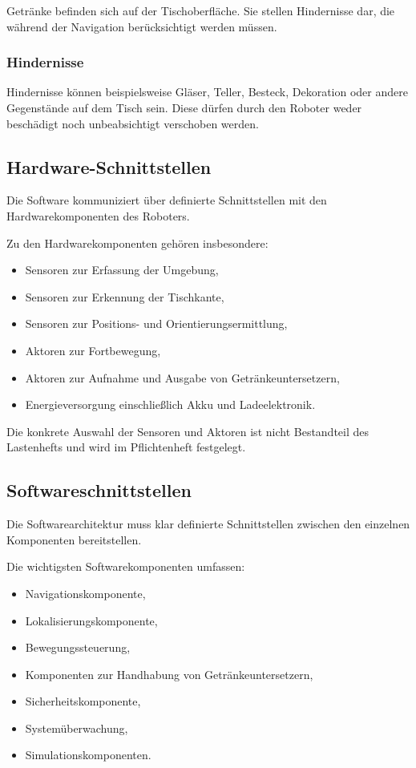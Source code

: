 \documentclass[
  a4paper,
  12pt,
  DIV=12,        %
  parskip=half,  %
  headings=small %
]{scrartcl}
\theoremstyle{definition}
\providecommand{\tightlist}{%
  \setlength{\itemsep}{0pt}\setlength{\parskip}{0pt}}
\theoremstyle{definition}
\begin{document}
Getränke befinden sich auf der Tischoberfläche. Sie stellen Hindernisse
dar, die während der Navigation berücksichtigt werden müssen.

\subsubsection{Hindernisse}\label{hindernisse}

Hindernisse können beispielsweise Gläser, Teller, Besteck, Dekoration
oder andere Gegenstände auf dem Tisch sein. Diese dürfen durch den
Roboter weder beschädigt noch unbeabsichtigt verschoben werden.

\subsection{Hardware-Schnittstellen}\label{hardware-schnittstellen}

Die Software kommuniziert über definierte Schnittstellen mit den
Hardwarekomponenten des Roboters.

Zu den Hardwarekomponenten gehören insbesondere:

\begin{itemize}
\tightlist
\item
  Sensoren zur Erfassung der Umgebung,
\item
  Sensoren zur Erkennung der Tischkante,
\item
  Sensoren zur Positions- und Orientierungsermittlung,
\item
  Aktoren zur Fortbewegung,
\item
  Aktoren zur Aufnahme und Ausgabe von Getränkeuntersetzern,
\item
  Energieversorgung einschließlich Akku und Ladeelektronik.
\end{itemize}

Die konkrete Auswahl der Sensoren und Aktoren ist nicht Bestandteil des
Lastenhefts und wird im Pflichtenheft festgelegt.

\subsection{Softwareschnittstellen}\label{softwareschnittstellen}

Die Softwarearchitektur muss klar definierte Schnittstellen zwischen den
einzelnen Komponenten bereitstellen.

Die wichtigsten Softwarekomponenten umfassen:

\begin{itemize}
\tightlist
\item
  Navigationskomponente,
\item
  Lokalisierungskomponente,
\item
  Bewegungssteuerung,
\item
  Komponenten zur Handhabung von Getränkeuntersetzern,
\item
  Sicherheitskomponente,
\item
  Systemüberwachung,
\item
  Simulationskomponenten.
\end{itemize}
\end{document}
